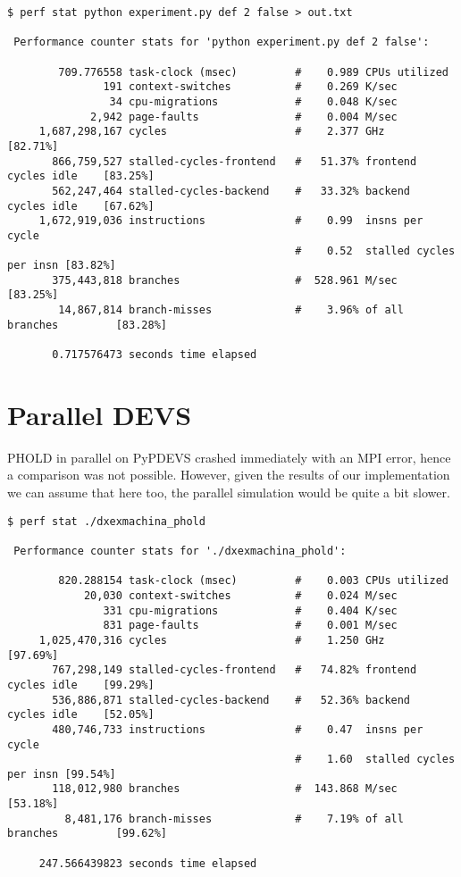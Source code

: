 \documentclass[10pt,a4paper]{report}
\begin{document}
\begin{Verbatim}[fontsize=\small]
$ perf stat python experiment.py def 2 false > out.txt

 Performance counter stats for 'python experiment.py def 2 false':

        709.776558 task-clock (msec)         #    0.989 CPUs utilized          
               191 context-switches          #    0.269 K/sec                  
                34 cpu-migrations            #    0.048 K/sec                  
             2,942 page-faults               #    0.004 M/sec                  
     1,687,298,167 cycles                    #    2.377 GHz                     [82.71%]
       866,759,527 stalled-cycles-frontend   #   51.37% frontend cycles idle    [83.25%]
       562,247,464 stalled-cycles-backend    #   33.32% backend  cycles idle    [67.62%]
     1,672,919,036 instructions              #    0.99  insns per cycle        
                                             #    0.52  stalled cycles per insn [83.82%]
       375,443,818 branches                  #  528.961 M/sec                   [83.25%]
        14,867,814 branch-misses             #    3.96% of all branches         [83.28%]

       0.717576473 seconds time elapsed
\end{Verbatim}

\section{Parallel DEVS}
PHOLD in parallel on PyPDEVS crashed immediately with an MPI error, hence a comparison was not possible. However, given the results of our implementation we can assume that here too, the parallel simulation would be quite a bit slower.
\begin{Verbatim}[fontsize=\small]
$ perf stat ./dxexmachina_phold 

 Performance counter stats for './dxexmachina_phold':

        820.288154 task-clock (msec)         #    0.003 CPUs utilized          
            20,030 context-switches          #    0.024 M/sec                  
               331 cpu-migrations            #    0.404 K/sec                  
               831 page-faults               #    0.001 M/sec                  
     1,025,470,316 cycles                    #    1.250 GHz                     [97.69%]
       767,298,149 stalled-cycles-frontend   #   74.82% frontend cycles idle    [99.29%]
       536,886,871 stalled-cycles-backend    #   52.36% backend  cycles idle    [52.05%]
       480,746,733 instructions              #    0.47  insns per cycle        
                                             #    1.60  stalled cycles per insn [99.54%]
       118,012,980 branches                  #  143.868 M/sec                   [53.18%]
         8,481,176 branch-misses             #    7.19% of all branches         [99.62%]

     247.566439823 seconds time elapsed
\end{Verbatim}
\end{document}
